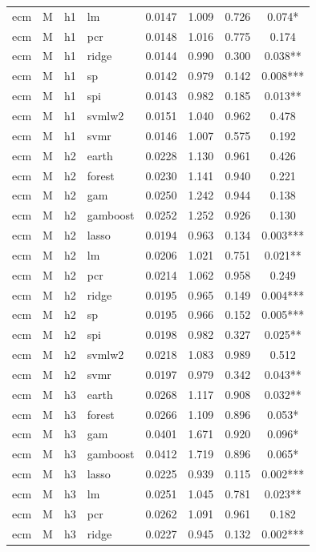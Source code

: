 \begin{ThreePartTable}
\begin{longtable}[t]{llclcccc}
ecm & M & h1 & lm & 0.0147 & 1.009 & 0.726 & 0.074*\\
ecm & M & h1 & pcr & 0.0148 & 1.016 & 0.775 & 0.174\\
ecm & M & h1 & ridge & 0.0144 & 0.990 & 0.300 & 0.038**\\
ecm & M & h1 & sp & 0.0142 & 0.979 & 0.142 & 0.008***\\
ecm & M & h1 & spi & 0.0143 & 0.982 & 0.185 & 0.013**\\
ecm & M & h1 & svmlw2 & 0.0151 & 1.040 & 0.962 & 0.478\\
ecm & M & h1 & svmr & 0.0146 & 1.007 & 0.575 & 0.192\\
\addlinespace
ecm & M & h2 & earth & 0.0228 & 1.130 & 0.961 & 0.426\\
ecm & M & h2 & forest & 0.0230 & 1.141 & 0.940 & 0.221\\
ecm & M & h2 & gam & 0.0250 & 1.242 & 0.944 & 0.138\\
ecm & M & h2 & gamboost & 0.0252 & 1.252 & 0.926 & 0.130\\
ecm & M & h2 & lasso & 0.0194 & 0.963 & 0.134 & 0.003***\\
ecm & M & h2 & lm & 0.0206 & 1.021 & 0.751 & 0.021**\\
ecm & M & h2 & pcr & 0.0214 & 1.062 & 0.958 & 0.249\\
ecm & M & h2 & ridge & 0.0195 & 0.965 & 0.149 & 0.004***\\
ecm & M & h2 & sp & 0.0195 & 0.966 & 0.152 & 0.005***\\
ecm & M & h2 & spi & 0.0198 & 0.982 & 0.327 & 0.025**\\
ecm & M & h2 & svmlw2 & 0.0218 & 1.083 & 0.989 & 0.512\\
ecm & M & h2 & svmr & 0.0197 & 0.979 & 0.342 & 0.043**\\
\addlinespace
ecm & M & h3 & earth & 0.0268 & 1.117 & 0.908 & 0.032**\\
ecm & M & h3 & forest & 0.0266 & 1.109 & 0.896 & 0.053*\\
ecm & M & h3 & gam & 0.0401 & 1.671 & 0.920 & 0.096*\\
ecm & M & h3 & gamboost & 0.0412 & 1.719 & 0.896 & 0.065*\\
ecm & M & h3 & lasso & 0.0225 & 0.939 & 0.115 & 0.002***\\
ecm & M & h3 & lm & 0.0251 & 1.045 & 0.781 & 0.023**\\
ecm & M & h3 & pcr & 0.0262 & 1.091 & 0.961 & 0.182\\
ecm & M & h3 & ridge & 0.0227 & 0.945 & 0.132 & 0.002***\\

\end{longtable}
\end{ThreePartTable}
